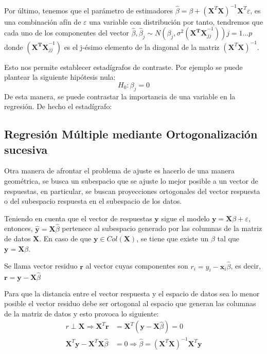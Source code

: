 \noindent Por último, tenemos que el parámetro de estimadores $\hat{\beta}= \beta+(\mathbf{X}^T\mathbf{X})^{-1}\mathbf{X}^T \varepsilon$, es una combinación afín de $\varepsilon$ una variable con distribución por tanto, tendremos que cada uno de los componentes del vector $\hat{\beta},\hat{\beta}_j\sim N(\beta_j, \sigma^2(\mathbf{X^TX}_{jj}^{-1})) j=1\ldots p$ donde $(\mathbf{X^TX}_{jj}^{-1})$ es el j-ésimo elemento de la diagonal de la matriz $(\mathbf{X}^T\mathbf{X})^{-1}$.

\noindent Esto nos permite establecer estadígrafos de contraste. Por ejemplo se puede plantear la siguiente hipótesis nula:
\begin{equation}
H_0: \beta_j=0
\end{equation}
\noindent De esta manera, se puede contrastar la importancia de una variable en la regresión. De hecho el estadígrafo:
\begin{equation}

\end{equation}

\subsection{Regresión Múltiple mediante Ortogonalización sucesiva }

\noindent Otra manera de afrontar el problema de ajuste es hacerlo de una manera geométrica, se busca un subespacio que se ajuste lo mejor posible a un vector de respuestas, en particular, se buscan proyecciones ortogonales del vector respuesta o del subespacio respuesta en el subespacio de los datos. 


\noindent Teniendo en cuenta que el vector de respuestas $\textbf{y}$ sigue el modelo $\textbf{y}=\textbf{X}\beta+\varepsilon$, entonces, $\hat{\textbf{y}}=\textbf{X}\hat{\beta}$ pertenece al subespacio generado por las columnas de la matriz de datos $\textbf{X}$. En caso de que $\textbf{y}\in Col(\textbf{X})$, se tiene que existe un $\beta$ tal que $\textbf{y}=\textbf{X}\beta$. 

\begin{defi}
Se llama vector residuo $\textbf{r}$ al vector cuyas componentes son $r_i=y_i-\textbf{x}_i\hat{\beta}$, es decir, $\textbf{r}=\textbf{y}-\textbf{X}\hat{\beta}$
\end{defi}

\noindent Para que la distancia entre el vector respuesta y el espacio de datos sea lo menor posible el vector residuo debe ser ortogonal al espacio que generan las columnas de la matriz de datos y esto provoca lo siguiente:
\begin{equation}
\begin{split}
r \perp \textbf{X}\Rightarrow \textbf{X}^T \textbf{r}&=\textbf{X}^T (\textbf{y}-\textbf{X}\hat{\beta})=0\\
\textbf{X}^T\textbf{y}-\textbf{X}^T\textbf{X}\hat{\beta}&=0\Rightarrow \hat{\beta}= (\textbf{X}^T\textbf{X})^{-1} \textbf{X}^T \textbf{y}
\end{split} 
\end{equation}

